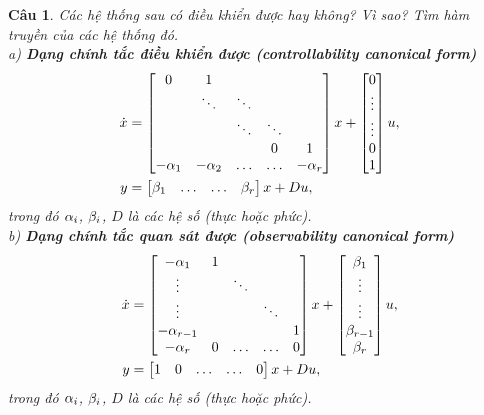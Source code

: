\documentclass[11pt]{article}
\newtheorem{bt}{Câu}
\begin{document}
\begin{bt}
Các hệ thống sau có điều khiển được hay không? Vì sao? Tìm hàm truyền của các hệ thống đó.\\
\noindent	a) \textbf{Dạng chính tắc điều khiển được (controllability canonical form)}
	\begin{align}
		\dot{x} &= \begin{bmatrix} 0 & 1 & &  & \\ &  \ddots & \ddots &  & \\ & & \ddots & \ddots &   \\&  &  & 0 & 1 \\ -\alpha_1 & -\alpha_2 & \dots & \dots & -\alpha_{r}  \end{bmatrix} x + \begin{bmatrix} 0 \\ \vdots \\ \vdots \\ 0 \\ 1 \end{bmatrix} u, \\
		y &= \begin{bmatrix} \beta_1 &  \dots & \dots & \beta_r \end{bmatrix} x + D u, 
	\end{align}
	trong đó $\alpha_i$, $\beta_i$, $D$ là các hệ số (thực hoặc phức). \\
\noindent	b) \textbf{Dạng chính tắc quan sát được (observability canonical form)}
	\begin{align}
		\dot{x} &= \begin{bmatrix} -\alpha_1 & 1 & &  & \\ \vdots &   & \ddots &  & \\ \vdots & & & \ddots &   \\ -\alpha_{r-1} &  &  &  & 1 \\ -\alpha_{r} & 0 & \dots & \dots & 0 \end{bmatrix} x + \begin{bmatrix} \beta_1 \\  \vdots \\ \vdots \\ \beta_{r-1} \\ \beta_r \end{bmatrix} u, \\
		y &= \begin{bmatrix} 1 &  0 & \dots & \dots & 0 \end{bmatrix} x + D u, 
	\end{align}
	trong đó $\alpha_i$, $\beta_i$, $D$ là các hệ số (thực hoặc phức). 
\end{bt}
\end{document}
